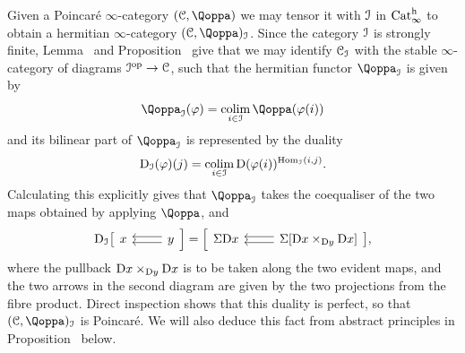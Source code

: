 Given a Poincaré $\infty$-category $(\C,\QF)$ we may tensor it with $\mathcal{I}$ in $\mathrm{Cat}^\mathrm{h}_\infty$ to obtain a hermitian $\infty$-category $(\C,\QF)_\I$. Since the category \(\mathcal{I}\) is strongly finite,
Lemma~ and Proposition~ give that we may identify \(\mathcal C_{\mathcal{I}}\) with the stable \(\infty\)-category of diagrams \(\mathcal{I}^\mathrm{op} \to \mathcal C\), such that the hermitian functor \(\QF_\I\) is given by
\[
\QF_{\I}(\vphi) = \colim_{i \in \I}\QF(\vphi(i)) 
\]
and its bilinear part of $\QF_{\I}$ is represented by the %
duality
\[
\mathrm{D}_{\mathcal{I}}(\varphi)(j) = \mathop{\mathrm{colim}}_{i \in \mathcal{I}}\mathrm{D}(\varphi(i))^{\operatorname{Hom}_{\mathcal{I}}(i,j)}.
\]
Calculating this explicitly gives that $\QF_\I$ takes the coequaliser of the two maps obtained by applying $\QF$, and 
\begin{equation}
\label{equation:explicit-dual-I}%
\Dual_{\I}
\big[
\begin{tikzcd}
\x  & \ar[l,shift right]\ar[l,shift left] \y 
\end{tikzcd}
\Big] = 
\Big[
\begin{tikzcd}
\Sig\Dual\x  & \ar[l,shift right]\ar[l,shift left] \Sig[\Dual\x \times_{\Dual \y}\Dual\x] 
\end{tikzcd}
\big],
\end{equation}
where the pullback $\mathrm{D} x\times_{\mathrm{D} y} \mathrm{D} x$ is to be taken along the two evident maps, and the two arrows in the second diagram are given by the two projections from the fibre product. Direct inspection shows that this duality is perfect, so that $(\C,\QF)_\I$ is Poincaré.
We will also deduce this fact from abstract principles in Proposition~ below.




